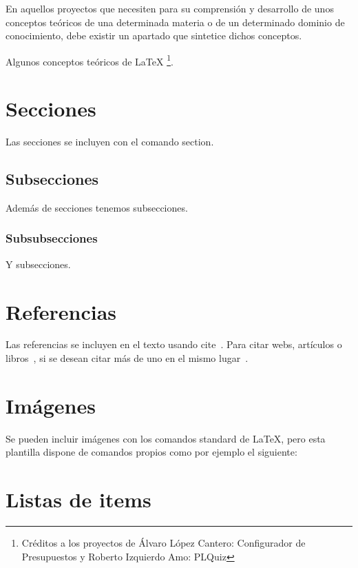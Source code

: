 







En aquellos proyectos que necesiten para su comprensión y desarrollo de unos conceptos teóricos de una determinada materia o de un determinado dominio de conocimiento, debe existir un apartado que sintetice dichos conceptos.

Algunos conceptos teóricos de \LaTeX{} \footnote{Créditos a los proyectos de Álvaro López Cantero: Configurador de Presupuestos y Roberto Izquierdo Amo: PLQuiz}.

\section{Secciones}

Las secciones se incluyen con el comando section.

\subsection{Subsecciones}

Además de secciones tenemos subsecciones.

\subsubsection{Subsubsecciones}

Y subsecciones. 


\section{Referencias}

Las referencias se incluyen en el texto usando cite~\cite{wiki:latex}. Para citar webs, artículos o libros~\cite{koza92}, si se desean citar más de uno en el mismo lugar~\cite{bortolot2005, koza92}.


\section{Imágenes}

Se pueden incluir imágenes con los comandos standard de \LaTeX, pero esta plantilla dispone de comandos propios como por ejemplo el siguiente:




\section{Listas de items}

